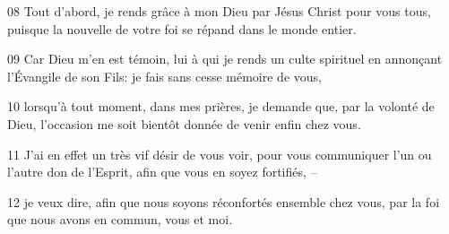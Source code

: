 
08 Tout d’abord, je rends grâce à mon Dieu par Jésus Christ pour vous tous, puisque la nouvelle de votre foi se répand dans le monde entier.

09 Car Dieu m’en est témoin, lui à qui je rends un culte spirituel en annonçant l’Évangile de son Fils: je fais sans cesse mémoire de vous,

10 lorsqu’à tout moment, dans mes prières, je demande que, par la volonté de Dieu, l’occasion me soit bientôt donnée de venir enfin chez vous.

11 J’ai en effet un très vif désir de vous voir, pour vous communiquer l’un ou l’autre don de l’Esprit, afin que vous en soyez fortifiés, –

12 je veux dire, afin que nous soyons réconfortés ensemble chez vous, par la foi que nous avons en commun, vous et moi.
